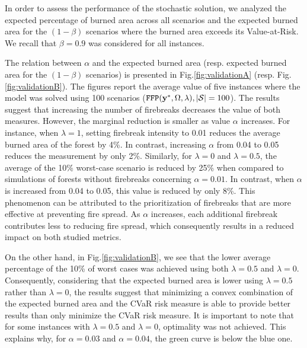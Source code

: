 \documentclass[a4paper,fleqn]{cas-sc}
\begin{document}
In order to assess the performance of the stochastic solution, we analyzed the expected percentage of burned area across all scenarios and the expected burned area for the $(1-\beta)$ scenarios where the burned area exceeds its Value-at-Risk. We recall that $\beta=0.9$ was considered for all instances. 

The relation between $\alpha$ and the expected burned area (resp. expected burned area for the $(1-\beta)$ scenarios) is presented in Fig.\:\ref{fig:validationA} (resp. Fig.\:\ref{fig:validationB}). The figures report the average value of five instances where the model was solved using 100 scenarios ($\texttt{FFP}(\vb{y}^*,\Omega, \lambda), \vert \mathcal{S} \rvert = 100$). The results suggest that increasing the number of firebreaks decreases the value of both measures. However, the marginal reduction is smaller as value $\alpha$ increases. For instance, when $\lambda = 1$, setting firebreak intensity to 0.01 reduces the average burned area of the forest by 4\%. In contrast, increasing $\alpha$ from 0.04 to 0.05 reduces the measurement by only 2\%. Similarly, for $\lambda = 0$ and $\lambda = 0.5$, the average of the 10\% worst-case scenario is reduced by 25\% when compared to simulations of forests without firebreaks concerning $\alpha = 0.01$. In contrast, when $\alpha$ is increased from 0.04 to 0.05, this value is reduced by only 8\%. This phenomenon can be attributed to the prioritization of firebreaks that are more effective at preventing fire spread. As $\alpha$ increases, each additional firebreak contributes less to reducing fire spread, which consequently results in a reduced impact on both studied metrics. 

On the other hand, in Fig.\:\ref{fig:validationB}, we see that the lower average percentage of the 10\% of worst cases was achieved using both $\lambda = 0.5$ and $\lambda = 0$. Consequently, considering that the expected burned area is lower using $\lambda = 0.5$ rather than $\lambda = 0$, the results suggest that minimizing a convex combination of the expected burned area and the CVaR risk measure is able to provide better results than only minimize the CVaR risk measure. It is important to note that for some instances with $\lambda = 0.5$ and $\lambda = 0$, optimality was not achieved. This explains why, for $\alpha = 0.03$ and $\alpha = 0.04$, the green curve is below the blue one.
\end{document}
